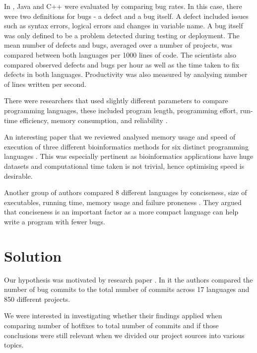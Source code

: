 In \cite{Phipps1999}, Java and C++ were evaluated by comparing bug rates. In this case, there were two definitions for bugs - a defect and a bug itself. A defect included issues such as syntax errors, logical errors and changes in variable name. A bug itself was only defined to be a problem detected during testing or deployment. The mean number of defects and bugs, averaged over a number of projects, was compared between both languages per 1000 lines of code. The scientists also compared observed defects and bugs per hour as well as the time taken to fix defects in both languages. Productivity was also measured by analysing number of lines written per second.\par

There were researchers that used slightly different parameters to compare programming languages, these included program length, programming effort, run-time efficiency, memory consumption, and reliability \cite{Prechelt2000}.\par

An interesting paper that we reviewed analysed memory usage and speed of execution of three different bioinformatics methods for six distinct programming languages \cite{Nanz2015}. This was especially pertinent as bioinformatics applications have huge datasets and computational time taken is not trivial, hence optimising speed is desirable.\par

Another group of authors compared 8 different languages by conciseness, size of executables, running time, memory usage and failure proneness \cite{Dyer-Nguyen-Rajan-Nguyen-13} . They argued that conciseness is an important factor as a more compact language can help write a program with fewer bugs.


\section{Solution}
Our hypothesis was motivated by research paper \cite{Ray2014}. In it the authors compared the number of bug commits to the total number of commits across 17 languages and 850 different projects.\par

We were interested in investigating whether their findings applied when comparing number of hotfixes to total number of commits and if those conclusions were still relevant when we divided our project sources into various topics.\par

